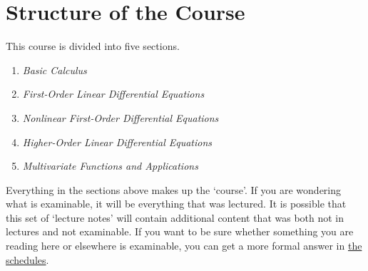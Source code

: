 \documentclass[a4paper]{scrreprt}
\begin{document}
\section{Structure of the Course}

This course is divided into five sections.

\begin{enumerate}
	\item \emph{Basic Calculus}
	


	\item \emph{First-Order Linear Differential Equations}
	

	\item \emph{Nonlinear First-Order Differential Equations}
	\item \emph{Higher-Order Linear Differential Equations}
	\item \emph{Multivariate Functions and Applications}
	

\end{enumerate}

Everything in the sections above makes up the `course'. If you are wondering what is examinable, it will be everything that was lectured. It is possible that this set of `lecture notes' will contain additional content that was both not in lectures and not examinable. If you want to be sure whether something you are reading here or elsewhere is examinable, you can get a more formal answer in \href{https://www.maths.cam.ac.uk/undergrad/files/schedules.pdf}{the schedules}.
\end{document}
